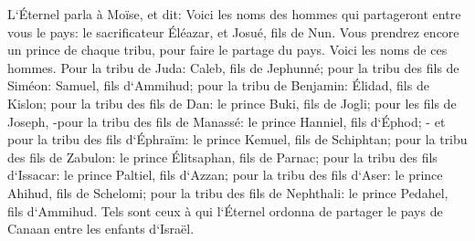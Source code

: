 \verse L`Éternel parla à Moïse, et dit: 
\verse Voici les noms des hommes qui partageront entre vous le pays: le sacrificateur Éléazar, et Josué, fils de Nun. 
\verse Vous prendrez encore un prince de chaque tribu, pour faire le partage du pays. 
\verse Voici les noms de ces hommes. Pour la tribu de Juda: Caleb, fils de Jephunné; 
\verse pour la tribu des fils de Siméon: Samuel, fils d`Ammihud; 
\verse pour la tribu de Benjamin: Élidad, fils de Kislon; 
\verse pour la tribu des fils de Dan: le prince Buki, fils de Jogli; 
\verse pour les fils de Joseph, -pour la tribu des fils de Manassé: le prince Hanniel, fils d`Éphod; - 
\verse et pour la tribu des fils d`Éphraïm: le prince Kemuel, fils de Schiphtan; 
\verse pour la tribu des fils de Zabulon: le prince Élitsaphan, fils de Parnac; 
\verse pour la tribu des fils d`Issacar: le prince Paltiel, fils d`Azzan; 
\verse pour la tribu des fils d`Aser: le prince Ahihud, fils de Schelomi; 
\verse pour la tribu des fils de Nephthali: le prince Pedahel, fils d`Ammihud. 
\verse Tels sont ceux à qui l`Éternel ordonna de partager le pays de Canaan entre les enfants d`Israël. 

